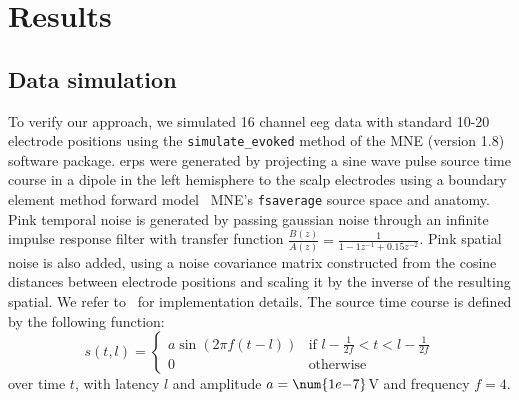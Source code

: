 \section{Results}
\label{sec:wcble/results}
\subsection{Data simulation}
To verify our approach, we simulated 16 channel \ac{eeg} data with standard
10-20 electrode positions using the \texttt{simulate\_evoked} method of the
MNE (version 1.8)~\cite{Gramfort2013} software package.
\Acp{erp} were generated by projecting a sine wave pulse source time course in a dipole in the
left hemisphere to the scalp electrodes using a boundary element method forward
model~\cite{Mosher1999} MNE's \texttt{fsaverage} source space and anatomy.
Pink temporal noise is generated by passing gaussian noise through an infinite
impulse response filter with transfer function
$\frac{B(z)}{A(z)} = \frac{1}{1 -1z^{-1}+0.15z^{-2}}$.
Pink spatial noise is also added, using a noise covariance matrix constructed from the
cosine distances between electrode positions and scaling it by the inverse of
the resulting spatial.
We refer to~\textcite{Gramfort2014} for implementation details.
The source time course is defined by the following function:
\begin{equation}
  s(t,l) =
  \begin{cases}
    a\sin\left(2\pi f\left(t-l\right)\right) & \text{if  $l-\frac{1}{2f} < t < l-\frac{1}{2f}$} \\
    0 & \text{otherwise}
  \end{cases}
\end{equation}
over time $t$, with latency $l$ and amplitude $a=\num{1e{-7}}$V and frequency
$f=4$.

